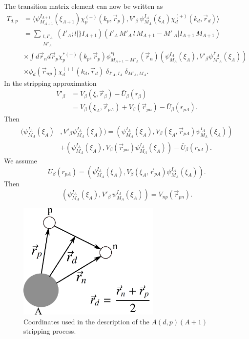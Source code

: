 The transition matrix element can now be written as
\begin{equation}\label{eq423}
 \begin{split}
T_{d,p}&= \langle \psi_{M_{A+1}}^{I_{A+1}}(\xi_{A+1}) \chi^{(-)}_p(k_p,\vec{r}_p),
V'_\beta \, \psi_{M_{A}}^{I_{A}}(\xi_{A}) \chi^{(+)}_d(k_d,\vec{r}_d)\rangle \\
&= \sum_{\substack{l,I'_A\\M'_A}} (I'_A;l \vert \} I_{A+1}) (I'_A \,M'_A\, l\, M_{A+1}-M'\,_A \vert I_{A+1}\,M_{A+1})\\
& \times\int d\vec{r}_n d \vec{r}_p \chi^{* (-)}_p(k_p,\vec{r}_p) \phi_{M_{A+1}-M'_A}^{*l}(\vec{r}_n)
(\psi_{M_{A}}^{I_{A}}(\xi_{A}),V'_\beta \psi_{M'_{A}}^{I'_{A}}(\xi_{A}))\\
& \times\phi_d(\vec r_{np})
\chi^{(+)}_d(k_d,\vec{r}_d) \; \delta_{I'_A,I_A} \; \delta_{M'_A,M_A}.
\end{split}
\end{equation}
In the stripping approximation
\begin{equation}\label{eq424}
 \begin{split}
V'_\beta & = V_\beta(\xi,\vec r_\beta)- \bar U_\beta (r_\beta)\\
&=V_\beta(\xi_A,\vec r_{pA})+V_\beta(\vec r_{pn})-\bar U_\beta (r_{pA}).
\end{split}
\end{equation}
Then
\begin{equation}\label{eq425}
 \begin{split}
(\psi_{M_{A}}^{I_{A}}(\xi_{A}) & ,V'_\beta \psi_{M_{A}}^{I_{A}}(\xi_{A}))=
(\psi_{M_{A}}^{I_{A}}(\xi_{A}), V_\beta(\xi_A,\vec r_{pA}) \psi_{M_{A}}^{I_{A}}(\xi_{A}))\\
&+(\psi_{M_{A}}^{I_{A}}(\xi_{A}), V_\beta(\vec r_{pn})
\psi_{M_{A}}^{I_{A}}(\xi_{A}))- \bar U_\beta (r_{pA}).
\end{split}
\end{equation}
We assume
\begin{equation}\label{eq426}
  U_\beta (r_{pA})=(\psi_{M_{A}}^{I_{A}}(\xi_{A}), V_\beta(\xi_A,\vec r_{pA}) \psi_{M_{A}}^{I_{A}}(\xi_{A})).
\end{equation}
Then
\begin{equation}\label{eq427}
(\psi_{M_{A}}^{I_{A}}(\xi_{A}), V'_\beta\, \psi_{M_{A}}^{I_{A}}(\xi_{A}))= V_{np}(\vec r_{pn}).
\end{equation}
 \begin{figure}
\centerline{\includegraphics*[width=7cm,angle=0]{C6/figs_C6/fig6_E1}}
\caption{Coordinates used in the description of the $A (d,p)(A+1)$ stripping process.}\label{fig6_E1}
\end{figure}

